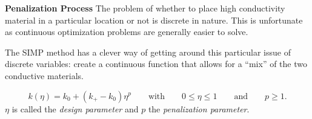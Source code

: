 \documentclass[final]{beamer}
\begin{document}
\begin{frame}{\textbf{Penalization Process}}
	The problem of whether to place high conductivity material in a particular location or not is {\color{tiananmen}discrete} in nature. This is unfortunate as continuous optimization problems are generally easier to solve.\vfill\pause
	
	The SIMP method has a clever way of getting around this particular issue of discrete variables: create a continuous function that allows for a ``mix'' of the two conductive materials.\pause
	
	\begin{equation}
		k\left(\eta\right)=k_0+\left(k_+-k_0\right)\eta^p\qquad\text{with}\qquad 0\leq\eta\leq 1\qquad\text{and}\qquad p\geq1.\label{eqn:penalization}
	\end{equation}
	$\eta$ is called the {\color{baystate}\textit{design parameter}} and $p$ the {\color{baystate}\textit{penalization parameter}}.
\end{frame}

\end{document}
